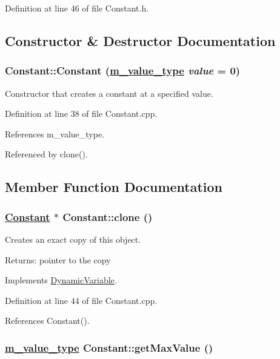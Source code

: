 Definition at line 46 of file Constant.h.

\subsection{Constructor \& Destructor Documentation}
\hypertarget{classConstant_a0}{
\subsubsection[Constant]{\setlength{\rightskip}{0pt plus 5cm}Constant::Constant (\hyperlink{Types_8h_a3}{m\_\-value\_\-type} {\em value} = 0)}}
\label{classConstant_a0}


Constructor that creates a constant at a specified value. 

Definition at line 38 of file Constant.cpp.

References m\_\-value\_\-type.

Referenced by clone().

\subsection{Member Function Documentation}
\hypertarget{classConstant_a1}{
\subsubsection[clone]{\setlength{\rightskip}{0pt plus 5cm}\hyperlink{classConstant}{Constant} $\ast$ Constant::clone ()}}
\label{classConstant_a1}


Creates an exact copy of this object. \begin{Desc}
\item[Returns:]pointer to the copy \end{Desc}


Implements \hyperlink{classDynamicVariable_a2}{Dynamic\-Variable}.

Definition at line 44 of file Constant.cpp.

References Constant().\hypertarget{classConstant_a6}{
\subsubsection[getMaxValue]{\setlength{\rightskip}{0pt plus 5cm}\hyperlink{Types_8h_a3}{m\_\-value\_\-type} Constant::get\-Max\-Value ()}}
\label{classConstant_a6}


